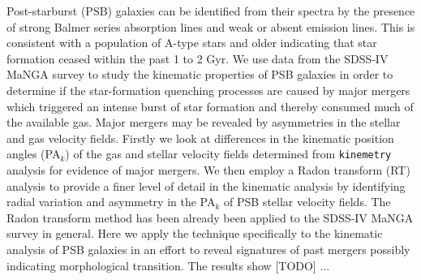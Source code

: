 
Post-starburst (PSB) galaxies can be identified from their spectra by the presence of strong Balmer series absorption lines and weak or absent emission lines. This is consistent with a population of A-type stars and older indicating that star formation ceased within the past 1 to 2 Gyr. We use data from the SDSS-IV MaNGA survey to study the kinematic properties of PSB galaxies in order to determine if the star-formation quenching processes are caused by major mergers which triggered an intense burst of star formation and thereby consumed much of the available gas. Major mergers may be revealed by asymmetries in the stellar and gas velocity fields. Firstly we look at differences in the kinematic position angles (PA$_{k}$) of the gas and stellar velocity fields determined from \texttt{kinemetry} analysis for evidence of major mergers. We then employ a Radon transform (RT) analysis to provide a finer level of detail in the kinematic analysis by identifying radial variation and asymmetry in the PA$_{k}$ of PSB stellar velocity fields. The Radon transform method has been already been applied to the SDSS-IV MaNGA survey in general. Here we apply the technique specifically to the kinematic analysis of PSB galaxies in an effort to reveal signatures of past mergers possibly indicating morphological transition. The results show [TODO] ... 



